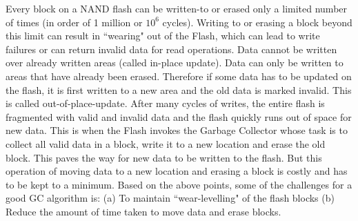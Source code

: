 Every block on a NAND flash can be written-to or erased only a limited number of times (in order of 1 million or $10^6$ cycles). Writing to or erasing a block beyond this limit can result in ``wearing" out of the Flash, which can lead to write failures or can return invalid data for read operations. Data cannot be written over already written areas (called in-place update). Data can only be written to areas that have already been erased. Therefore if some data has to be updated on the flash, it is first written to a new area and the old data is marked invalid. This is called out-of-place-update. After many cycles of writes, the entire flash is fragmented with valid and invalid data and the flash quickly runs out of space for new data. This is when the Flash invokes the Garbage Collector whose task is to collect all valid data in a block, write it to a new location and erase the old block. This paves the way for new data to be written to the flash. But this operation of moving data to a new location and erasing a block is costly and has to be kept to a minimum. Based on the above points, some of the challenges for a good GC algorithm is: (a) To maintain ``wear-levelling" of the flash blocks (b) Reduce the amount of time taken to move data and erase blocks. \\



